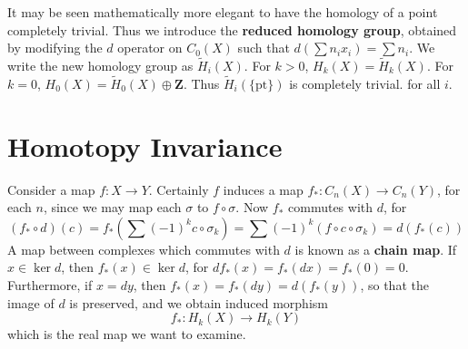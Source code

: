 It may be seen mathematically more elegant to have the homology of a point completely trivial. Thus we introduce the {\bf reduced homology group}, obtained by modifying the $d$ operator on $C_0(X)$ such that $d(\sum n_i x_i) = \sum n_i$. We write the new homology group as $\tilde{H}_i(X)$. For $k > 0$, $H_k(X) = \tilde{H}_k(X)$. For $k = 0$, $H_0(X) = \tilde{H}_0(X) \oplus \mathbf{Z}$. Thus $\tilde{H}_i(\{ \text{pt} \})$ is completely trivial. for all $i$.

\section{Homotopy Invariance}

Consider a map $f:X \to Y$. Certainly $f$ induces a map $f_*: C_n(X) \to C_n(Y)$, for each $n$, since we may map each $\sigma$ to $f \circ \sigma$. Now $f_*$ commutes with $d$, for
%
\[ (f_* \circ d)(c) = f_*(\sum (-1)^k c \circ \sigma_k) = \sum (-1)^k (f \circ c \circ \sigma_k) = d(f_*(c)) \]
%
A map between complexes which commutes with $d$ is known as a {\bf chain map}. If $x \in \ker d$, then $f_*(x) \in \ker d$, for $df_*(x) = f_*(dx) = f_*(0) = 0$. Furthermore, if $x = dy$, then $f_*(x) = f_*(dy) = d(f_*(y))$, so that the image of $d$ is preserved, and we obtain induced morphism
%
\[ f_*: H_k(X) \to H_k(Y) \]
%
which is the real map we want to examine.

